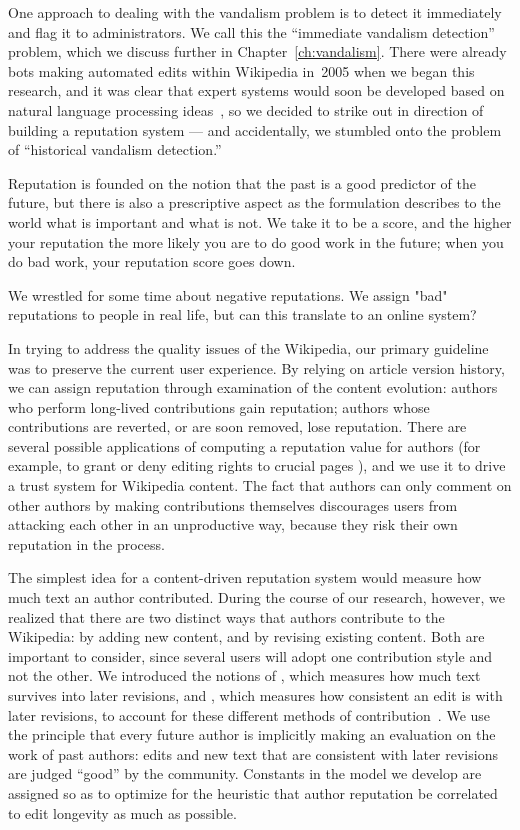 One approach to dealing with the vandalism problem is to detect
it immediately and flag it to administrators.
We call this the ``immediate vandalism detection'' problem,
which we discuss further in Chapter~\ref{ch:vandalism}.
There were already bots making automated edits within Wikipedia
in~2005 when we began this research, and it was clear that
expert systems would soon be developed based on natural language processing
ideas~\cite{wiki:AntiVandalBot,wiki:MartinBot,wiki:ClueBot,Carter2007},
so we decided to strike out in direction of building a reputation system
--- and accidentally, we stumbled onto the problem of
``historical vandalism detection.''


Reputation is founded on the notion that the past is a good
predictor of the future, but there is also a prescriptive aspect
as the formulation describes to the world what is important and
what is not.
We take it to be a score, and the higher your reputation the more
likely you are to do good work in the future; when you do bad
work, your reputation score goes down.

We wrestled for some time about negative reputations. We assign "bad"
reputations to people in real life, but can this translate to an online
system?  


In trying to address the quality issues of the Wikipedia,
our primary guideline was to preserve the current user experience.
By relying on article version history, we can assign reputation
through examination of the content evolution:
authors who perform long-lived contributions gain reputation; authors
whose contributions are reverted, or are soon removed, lose reputation.
There are several possible applications of computing a reputation
value for authors (for example, to grant or deny editing rights to
crucial pages \cite{Blaze96}), and we use it to drive a trust system for
Wikipedia content.
The fact that authors can only comment on other authors by
making contributions themselves discourages users from attacking
each other in an unproductive way, because they risk their own reputation in the process.


The simplest idea for a content-driven reputation system would measure
how much text an author contributed.
During the course of our research, however, we realized that there are
two distinct ways that authors contribute to the Wikipedia: by adding
new content, and by revising existing content.
Both are important to consider, since several users will
adopt one contribution style and not the other.
We introduced the notions of
, which measures how much text survives
into later revisions, and , which measures
how consistent an edit is with later revisions,
to account for these different methods of contribution~\cite{Adler2007}.
We use the principle that every future author is
implicitly making an evaluation on the work of past authors:
edits and new text that are consistent with later revisions
are judged ``good'' by the community.
Constants in the model we develop are assigned so as to optimize
for the heuristic that author reputation
be correlated to edit longevity as much as possible.

